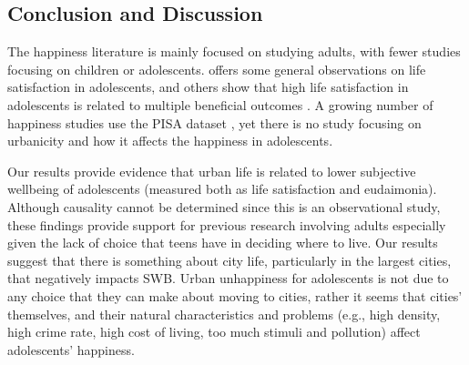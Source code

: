 \documentclass[11pt, letterpaper]{article}
\begin{document}
\begin{spacing}{1.9}
\section*{Conclusion and Discussion}

The happiness literature is mainly focused on studying adults, with fewer studies focusing on children or adolescents. \citet{huebner2004research} offers some general observations on life
satisfaction in adolescents, and  others show that high life satisfaction in
adolescents is related to multiple beneficial outcomes
\citep{proctor2010very,suldo2006extremely}.
 A growing number of happiness studies use the PISA dataset \citep[][]{tang2019immigration,rudolf2020life,chung2021exploring,pan2023using,marquez24}, yet there is no study focusing on urbanicity and how it affects the happiness in adolescents. 

Our results provide  evidence that urban life is related to lower subjective
wellbeing of adolescents (measured both as life satisfaction and
eudaimonia). Although causality cannot be determined since this is an
observational study, these findings provide  support for previous research
involving adults %
 especially given the lack of choice that teens have in deciding where to
 live. Our results suggest that there is something about city life, particularly
 in the largest cities,  that negatively impacts SWB. Urban unhappiness for
 adolescents is not due to any choice that they can make about moving to cities,
 rather it seems that cities' themselves, and their natural characteristics and
 problems (e.g., high density, high crime rate, high cost of living, too much
 stimuli and pollution)  affect adolescents' happiness.
 

\end{spacing}
\end{document}
